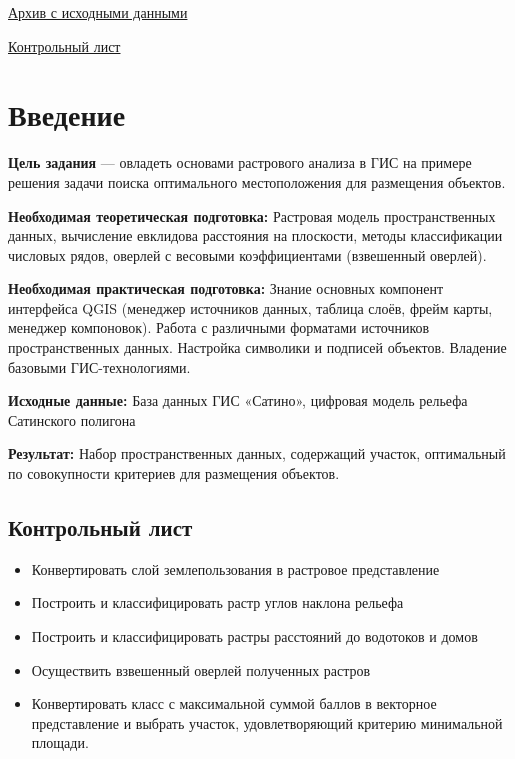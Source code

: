 \documentclass[
  12pt,
]{book}
\providecommand{\tightlist}{%
  \setlength{\itemsep}{0pt}\setlength{\parskip}{0pt}}
\begin{document}
\href{https://github.com/aentin/qgis-course/raw/master/files/Ex09.zip}{Архив с исходными данными}

\href{https://github.com/aentin/qgis-course/raw/master/files/Ex09_\%D0\%BE\%D1\%82\%D1\%87\%D1\%91\%D1\%82.docx}{Контрольный лист}

\hypertarget{weighted-overlay-intro}{%
\section{Введение}\label{weighted-overlay-intro}}

\textbf{Цель задания} --- овладеть основами растрового анализа в ГИС на примере решения задачи поиска оптимального местоположения для размещения объектов.

\textbf{Необходимая теоретическая подготовка:} Растровая модель пространственных данных, вычисление евклидова расстояния на плоскости, методы классификации числовых рядов, оверлей с весовыми коэффициентами (взвешенный оверлей).

\textbf{Необходимая практическая подготовка:} Знание основных компонент интерфейса QGIS (менеджер источников данных, таблица слоёв, фрейм карты, менеджер компоновок). Работа с различными форматами источников пространственных данных. Настройка символики и подписей объектов. Владение базовыми ГИС-технологиями.

\textbf{Исходные данные:} База данных ГИС «Сатино», цифровая модель рельефа Сатинского полигона

\textbf{Результат:} Набор пространственных данных, содержащий участок, оптимальный по совокупности критериев для размещения объектов.

\hypertarget{weighted-overlay-control}{%
\subsection{Контрольный лист}\label{weighted-overlay-control}}

\begin{itemize}
\tightlist
\item
  Конвертировать слой землепользования в растровое представление
\item
  Построить и классифицировать растр углов наклона рельефа
\item
  Построить и классифицировать растры расстояний до водотоков и домов
\item
  Осуществить взвешенный оверлей полученных растров
\item
  Конвертировать класс с максимальной суммой баллов в векторное представление и выбрать участок, удовлетворяющий критерию минимальной площади.
\end{itemize}
\end{document}
